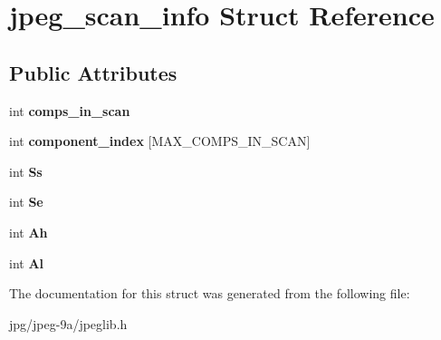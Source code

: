 \hypertarget{structjpeg__scan__info}{\section{jpeg\+\_\+scan\+\_\+info Struct Reference}
\label{structjpeg__scan__info}
}
\subsection*{Public Attributes}
\begin{DoxyCompactItemize}
\item 
\hypertarget{structjpeg__scan__info_addd94bff3ee52f961cf6fda5ea86ddca}{int {\bfseries comps\+\_\+in\+\_\+scan}}\label{structjpeg__scan__info_addd94bff3ee52f961cf6fda5ea86ddca}

\item 
\hypertarget{structjpeg__scan__info_a041f1af60508517345c1b76c48ee6567}{int {\bfseries component\+\_\+index} \mbox{[}M\+A\+X\+\_\+\+C\+O\+M\+P\+S\+\_\+\+I\+N\+\_\+\+S\+C\+A\+N\mbox{]}}\label{structjpeg__scan__info_a041f1af60508517345c1b76c48ee6567}

\item 
\hypertarget{structjpeg__scan__info_a33bc5abcded36ccd1b4c2ec94f6e2ba5}{int {\bfseries Ss}}\label{structjpeg__scan__info_a33bc5abcded36ccd1b4c2ec94f6e2ba5}

\item 
\hypertarget{structjpeg__scan__info_a4eefb8be0412f78566862c28a20fb254}{int {\bfseries Se}}\label{structjpeg__scan__info_a4eefb8be0412f78566862c28a20fb254}

\item 
\hypertarget{structjpeg__scan__info_a43834ca9482c7ea12cc97cf602da004b}{int {\bfseries Ah}}\label{structjpeg__scan__info_a43834ca9482c7ea12cc97cf602da004b}

\item 
\hypertarget{structjpeg__scan__info_a89cc9e990977c50b2b2058e6b9526e67}{int {\bfseries Al}}\label{structjpeg__scan__info_a89cc9e990977c50b2b2058e6b9526e67}

\end{DoxyCompactItemize}


The documentation for this struct was generated from the following file\+:\begin{DoxyCompactItemize}
\item 
jpg/jpeg-\/9a/jpeglib.\+h\end{DoxyCompactItemize}
